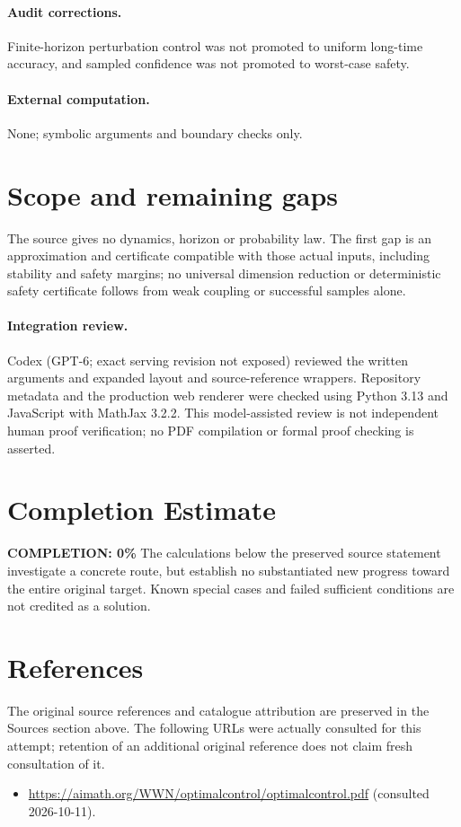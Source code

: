 \documentclass[11pt]{article}
\begin{document}
\paragraph{Audit corrections.} Finite-horizon perturbation control was not promoted to uniform long-time accuracy, and sampled confidence was not promoted to worst-case safety.
\paragraph{External computation.} None; symbolic arguments and boundary checks only.
\section{Scope and remaining gaps}
The source gives no dynamics, horizon or probability law. The first gap is
an approximation and certificate compatible with those actual inputs, including
stability and safety margins; no universal dimension reduction or deterministic
safety certificate follows from weak coupling or successful samples alone.
\paragraph{Integration review.} Codex (GPT-6; exact serving revision not exposed) reviewed the written arguments and expanded layout and source-reference wrappers. Repository metadata and the production web renderer were checked using Python 3.13 and JavaScript with MathJax 3.2.2. This model-assisted review is not independent human proof verification; no PDF compilation or formal proof checking is asserted.

\section{Completion Estimate}
\noindent\textbf{COMPLETION: 0\%}
The calculations below the preserved source statement investigate a concrete route,
but establish no substantiated new progress toward the entire original target.
Known special cases and failed sufficient conditions are not credited as a solution.
\section{References}
The original source references and catalogue attribution are preserved in the
Sources section above. The following URLs were actually consulted for this attempt;
retention of an additional original reference does not claim fresh consultation of it.
\begin{itemize}
\item \url{https://aimath.org/WWN/optimalcontrol/optimalcontrol.pdf} (consulted 2026-10-11). 
\end{itemize}
\end{document}
